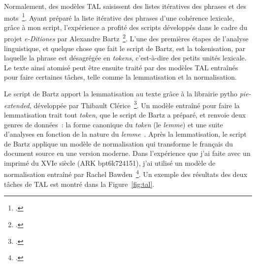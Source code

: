 \documentclass[class=article, crop=false]{standalone}
\begin{document}
Normalement, des modèles \acrshort{TAL} saisissent des listes itératives des phrases et des mots~\footcite{ortizsuarezAsynchronousPipelineProcessing2019}. Ayant préparé la liste itérative des phrases d'une cohérence lexicale, grâce à mon script, l'expérience a profité des scripts développés dans le cadre du projet \textit{e-Ditiones} par Alexandre Bartz~\footcite{bartzAnnotator2022}. L'une des premières étapes de l'analyse linguistique, et quelque chose que fait le script de Bartz, est la tokenisation, par laquelle la phrase est désagrégée en \textit{tokens}, c'est-à-dire des petits unités lexicale. Le texte ainsi atomisé peut être ensuite traité par des modèles \acrshort{TAL} entraînés pour faire certaines tâches, telle comme la lemmatisation et la normalisation.

Le script de Bartz apport la lemmatisation au texte grâce à la librairie pytho \textit{pie-extended}, développée par Thibault Clérice~\footcite{clericePieExtendedExtension2020a}. Un modèle entraîné pour faire la lemmatisation trait tout \textit{token}, que le script de Bartz a préparé, et renvoie deux genres de données~: la forme canonique du \textit{token} (le \textit{lemme}) et une suite d'analyses en fonction de la nature du \textit{lemme}~\footnotemark{}. Après la lemmatisation, le script de Bartz applique un modèle de normalisation qui transforme le français du document source en une version moderne. Dans l'expérience que j'ai faite avec un imprimé du XVIe siècle (\acrshort{ARK} bpt6k724151), j'ai utilisé un modèle de normalisation entraîné par Rachel Bawden~\footcite{bawdenModFrNormalisation2022}. Un exemple des résultats des deux tâches de \acrshort{TAL} est montré dans la Figure~\ref{fig:tal}.
\end{document}

